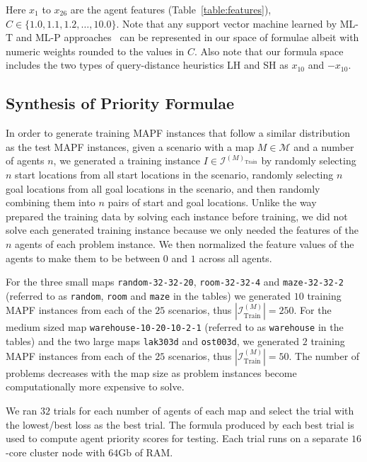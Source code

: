 \documentclass[letterpaper]{article}
\begin{document}
Here $ x_1 $ to $ x_{26} $ are the agent features (Table~\ref{table:features}), $ C \in \{1.0, 1.1, 1.2, \dots, 10.0\} $. Note that any support vector machine learned by ML-T and ML-P approaches~\citep{zhang2022learning} can be represented in our space of formulae albeit with numeric weights rounded to the values in $ C $. Also note that our formula space includes the two types of query-distance heuristics LH and SH as $ x_{10} $ and $ -x_{10} $.

\subsection{Synthesis of Priority Formulae}
\label{synth_pf}

In order to generate training MAPF instances that follow a similar distribution as the test MAPF instances, given a scenario with a map $ M \in \mathcal{M} $ and a number of agents $ n $, we generated a training instance $ I \in \mathcal{I}^{(M)_{\text{Train}}} $ by randomly selecting $ n $ start locations from all start locations in the scenario, randomly selecting $ n $ goal locations from all goal locations in the scenario, and then randomly combining them into $ n $ pairs of start and goal locations. Unlike the way~\citet{zhang2022learning} prepared the training data by solving each instance before training, we did not solve each generated training instance because we only needed the features of the $ n $ agents of each problem instance. We then normalized the feature values of the agents to make them to be between $ 0 $ and $ 1 $ across all agents.

For the three small maps {\tt random-32-32-20}, {\tt room-32-32-4} and {\tt maze-32-32-2} (referred to as {\tt random}, {\tt room} and {\tt maze} in the tables) we generated $ 10 $ training MAPF instances from each of the $ 25 $ scenarios, thus $ |\mathcal{I}^{(M)}_{\text{Train}}| = 250 $. For the medium sized map {\tt warehouse-10-20-10-2-1} (referred to as {\tt warehouse} in the tables) and the two large maps {\tt lak303d} and {\tt ost003d}, we generated $ 2 $ training MAPF instances from each of the $ 25 $ scenarios, thus $ |\mathcal{I}^{(M)}_{\text{Train}}| = 50 $. The number of problems decreases with the map size as problem instances become computationally more expensive to solve.

We ran $ 32 $ trials for each number of agents of each map and select the trial with the lowest/best loss as the best trial. The formula produced by each best trial is used to compute agent priority scores for testing. Each trial runs on a separate $ 16 $-core cluster node with $ 64 $Gb of RAM.
\end{document}
